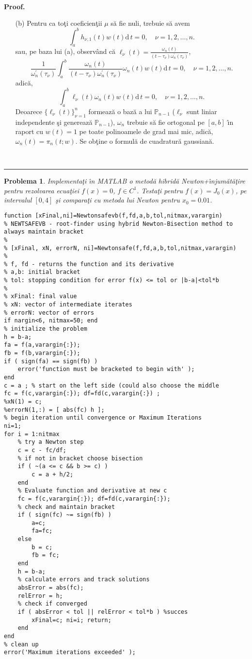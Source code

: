 \documentclass{article}%
\newtheorem{problem}[theorem]{Problema}
\newenvironment{proof}[1][Proof]{\noindent\textbf{#1.} }{\ \rule{0.5em}{0.5em}}
\begin{document}
\begin{proof}
\begin{enumerate}
\item[(b)] Pentru ca to\c{t}i coeficien\c{t}ii $\mu$ s\u{a} fie nuli, trebuie
s\u{a} avem
\[
\int_{a}^{b}h_{\nu,1}\left(  t\right)  w(t)\mathrm{d}\,t=0,\quad\nu
=1,2,\dots,n.
\]
sau, pe baza lui (a), observ\^{a}nd c\u{a} $\ell_{\nu}(t)=\frac{\omega_{n}%
(t)}{(t-\tau_{\nu})\omega_{n}^{\prime}(\tau_{\nu})}$,%
\[
\frac{1}{\omega_{n}^{\prime}(\tau_{\nu})}\int_{a}^{b}\frac{\omega_{n}%
(t)}{(t-\tau_{\nu})\omega_{n}^{\prime}(\tau_{\nu})}\omega_{n}(t)w(t)\mathrm{d}%
\,t=0,\quad\nu=1,2,\dots,n.
\]
adic\u{a},%
\[
\int_{a}^{b}\ell_{\nu}(t)\omega_{n}(t)w(t)\mathrm{d}\,t=0,\quad\nu
=1,2,\dots,n.
\]
Deoarece $\{\ell_{\nu}(t)\}_{\nu=1}^{n}$ formeaz\u{a} o baz\u{a} a lui
$\mathbb{P}_{n-1}$ ($\ell_{\nu}$ sunt liniar independente \c{s}i genereaz\u{a}
$\mathbb{P}_{n-1}$), $\omega_{n}$ trebuie s\u{a} fie ortogonal pe $[a,b]$
\^{\i}n raport cu $w(t)=1$ pe toate polinoamele de grad mai mic, adic\u{a},
$\omega_{n}(t)=\pi_{n}(t;w)$. Se ob\c{t}ine o formul\u{a} de cuadratur\u{a} gaussian\u{a}.
\end{enumerate}
\end{proof}

\begin{problem}
Implementa\c{t}i \^{\i}n MATLAB o metod\u{a} hibrid\u{a}
Newton+\^{\i}njum\u{a}t\u{a}\c{t}ire pentru rezolvarea ecua\c{t}iei $f(x)=0$,
$f\in C^{1}$. Testa\c{t}i pentru $f(x)=J_{0}(x)$, pe intervalul $[0,4]$ \c{s}i
compara\c{t}i cu metoda lui Newton pentru $x_{0}=0.01$.
\end{problem}


\begin{verbatim}
function [xFinal,ni]=Newtonsafevb(f,fd,a,b,tol,nitmax,varargin)
% NEWTSAFEVB - root-finder using hybrid Newton-Bisection method to always maintain bracket
%
% [xFinal, xN, errorN, ni]=Newtonsafe(f,fd,a,b,tol,nitmax,varargin)
%
% f, fd - returns the function and its derivative
% a,b: initial bracket
% tol: stopping condition for error f(x) <= tol or |b-a|<tol*b
%
% xFinal: final value
% xN: vector of intermediate iterates
% errorN: vector of errors
if nargin<6, nitmax=50; end
% initialize the problem
h = b-a;
fa = f(a,varargin{:});
fb = f(b,varargin{:});
if ( sign(fa) == sign(fb) )
    error('function must be bracketed to begin with' );
end
c = a ; % start on the left side (could also choose the middle
fc = f(c,varargin{:}); df=fd(c,varargin{:}) ;
%xN(1) = c;
%errorN(1,:) = [ abs(fc) h ];
% begin iteration until convergence or Maximum Iterations
ni=1;
for i = 1:nitmax
    % try a Newton step
    c = c - fc/df;
    % if not in bracket choose bisection
    if ( ~(a <= c && b >= c) )
        c = a + h/2;
    end
    % Evaluate function and derivative at new c
    fc = f(c,varargin{:}); df=fd(c,varargin{:});
    % check and maintain bracket
    if ( sign(fc) ~= sign(fb) )
        a=c;
        fa=fc;
    else
        b = c;
        fb = fc;
    end
    h = b-a;
    % calculate errors and track solutions
    absError = abs(fc);
    relError = h;
    % check if converged
    if ( absError < tol || relError < tol*b ) %succes
        xFinal=c; ni=i; return;
    end
end
% clean up
error('Maximum iterations exceeded' );

\end{verbatim}
\end{document}
